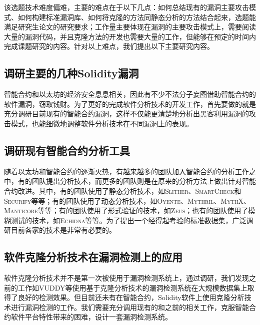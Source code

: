 该选题技术难度偏难，主要的难点在于以下几点：如何总结现有的漏洞主要攻击模式、如何构建标准漏洞库、如何将克隆的方法同静态分析的方法结合起来，选题能满足研究生论文的研究要求；工作量主要体现在漏洞的主要攻击模式上，需要阅读大量的漏洞代码，并且克隆方法的开发也需要大量的工作，但能够在预定的时间内完成课题研究的内容。针对以上难点，我们提出以下主要研究内容。

\subsection{调研主要的几种Solidity漏洞}

智能合约和以太坊的经济安全息息相关，因此有不少不法分子妄图借助智能合约的软件漏洞，窃取钱财。为了更好的完成软件分析技术的开发工作，首先要做的就是充分调研目前现有的智能合约漏洞，这样不仅能更清楚地分析出黑客利用漏洞的攻击模式，也能细微地调整软件分析技术在不同漏洞上的表现。

\subsection{调研现有智能合约分析工具}

随着以太坊和智能合约的逐渐火热，有越来越多的团队加入智能合约的分析工作之中，有的团队提出分析技术，而更多的团队则是在原来的分析方法上做出针对智能合约改进。其中，有的团队使用了静态分析技术，如\textsc{Slither}、\textsc{SmartCheck}和\textsc{Securify}等等；有的团队使用了动态分析技术，如\textsc{Oyente}、\textsc{Mythril}、\textsc{MythX}、\textsc{Manticore}等等；有的团队使用了形式验证的技术，如\textsc{Zeus}；也有的团队使用了模糊测试的技术，如\textsc{Echidna}等等。为了提出一个经得起考验的标准数据集，广泛调研目前各家的技术是非常有必要的。

%

\subsection{软件克隆分析技术在漏洞检测上的应用}

软件克隆分析技术并不是第一次被使用于漏洞检测系统上，通过调研，我们发现之前的工作如VUDDY\cite{vuddy}等使用基于克隆分析技术的漏洞检测系统在大规模数据集上取得了良好的检测效果。但目前还未有在智能合约，Solidity软件上使用克隆分析技术进行漏洞检测的工作。我们需要充分调用现有的和之前的相关工作，克服智能合约软件平台特性带来的困难，设计一套漏洞检测系统。

